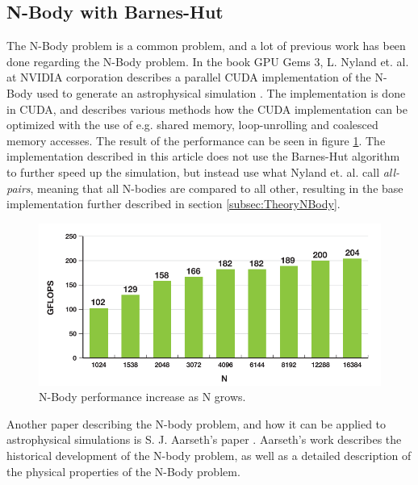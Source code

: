 \subsection{N-Body with Barnes-Hut}
The N-Body problem is a common problem, and a lot of previous work has been done regarding the N-Body problem. In the book GPU Gems 3, L. Nyland et. al. at NVIDIA corporation describes a parallel CUDA implementation of the N-Body used to generate an astrophysical simulation \cite{nyland2007fast}. The implementation is done in CUDA, and describes various methods how the CUDA implementation can be optimized with the use of e.g. shared memory, loop-unrolling and coalesced memory accesses. The result of the performance can be seen in figure \ref{fig:GPUGemsNBodyPerformance}. The implementation described in this article does not use the Barnes-Hut algorithm to further speed up the simulation, but instead use what Nyland et. al. call \textit{all-pairs}, meaning that all N-bodies are compared to all other, resulting in the base implementation further described in section \ref{subsec:TheoryNBody}. 

\begin{figure}[!htpb]
    \centering
    \includegraphics[width=\textwidth]{Introduction/Figs/GPUGemsNBodyComparison.png}
    \caption{N-Body performance increase as N grows. \cite{nyland2007fast}}
    \label{fig:GPUGemsNBodyPerformance}
\end{figure}

Another paper describing the N-body problem, and how it can be applied to astrophysical simulations is S. J. Aarseth's paper \cite{aarseth2003gravitational}. Aarseth's work describes the historical development of the N-body problem, as well as a detailed description of the physical properties of the N-Body problem.


